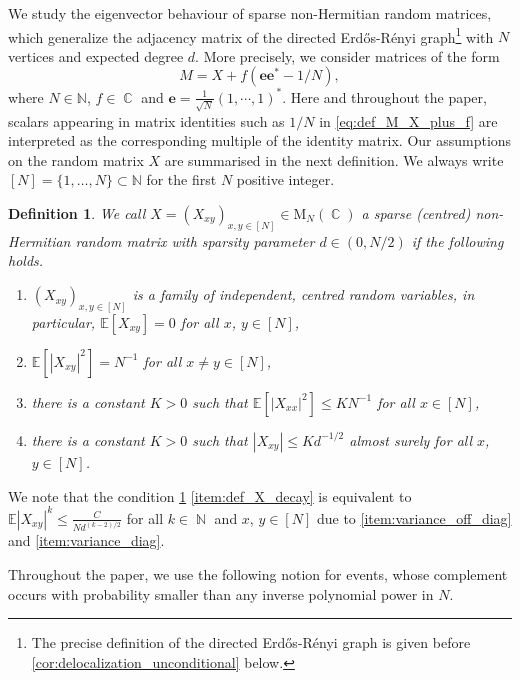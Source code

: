 \documentclass[11pt]{article}
\DeclareMathOperator{\CC}{\mathbb{C}}
\DeclareMathOperator{\NN}{\mathbb{N}}
\newcommand{\abs}[1]{\left| #1 \right|}
\newcommand{\N}{\mathbb{N}}
\newcommand{\E}{\mathbb{E}}
\theoremstyle{plain}
\newtheorem{defi}{Definition}[section]
\theoremstyle{remark}
\numberwithin{equation}{section}
\begin{document}
	We study the eigenvector behaviour of sparse non-Hermitian random matrices, which generalize 
	the adjacency matrix of the directed Erd\H{o}s-R{\'e}nyi graph\footnote{The precise definition of the directed Erd\H{o}s-R{\'e}nyi graph is given before \cref{cor:delocalization_unconditional} below.} with $N$ vertices and expected degree $d$.  More precisely, we consider matrices of the form 
	\begin{equation}\label{eq:def_M_X_plus_f}
		M= X + f (\mathbf{e}\mathbf{e}^{\ast} - 1/N), 
	\end{equation}
	where $N \in \N$, $ f\in \CC $ and $\mathbf{e} = \frac{1}{\sqrt{N}}(1,\cdots, 1)^{\ast}$. 
	Here and throughout the paper, scalars appearing in matrix identities such as $1/N$ in \cref{eq:def_M_X_plus_f} are interpreted as the corresponding multiple of the identity matrix. 
	Our assumptions on the random matrix $X$ are summarised in the next definition. 
	We always write $[N] = \{ 1, \ldots, N\}\subset \N $ for the first $N$ positive integer. 
	\begin{defi}\label{defiX}
		We call $X = (X_{xy})_{x, y \in [N]} \in \mathrm{M}_N(\CC)$ a \emph{sparse (centred) non-Hermitian random matrix} 
		with sparsity parameter $d \in (0,N/2)$ if the following holds. 
		\begin{enumerate}[label=(\alph*)]
			\item $(X_{xy})_{x, y \in [N]}$ is a family of independent, centred random variables, in particular, $\mathbb{E}[X_{xy}]= 0$ for all $x$, $y \in [N]$,
			\item  \label{item:variance_off_diag} $\E[\abs{X_{xy}}^2] = N^{-1}$ for all $x \neq y \in [N]$,
			\item  \label{item:variance_diag} 
			 there is a constant $K>0$ such that  $\E[\abs{X_{xx}}^2] \leq K N^{-1}$ for all $x \in [N]$, 
			\item \label{item:def_X_decay} 
			there is a constant $K>0$ such that $\abs{X_{xy}} \leq Kd^{-1/2}$ almost surely for all $x$, $y \in [N]$.
		\end{enumerate}
	\end{defi}
	
	 We note that the condition \cref{defiX} \cref{item:def_X_decay} is equivalent to $\E \abs{X_{xy}}^k \leq \frac{C}{Nd^{(k-2)/2}}$ for all $k\in \NN$ and $x$, $y \in [N]$ due to \cref{item:variance_off_diag} and \cref{item:variance_diag}.
	

	
	
	Throughout the paper, we use the following notion for events, whose complement occurs with probability smaller than any inverse polynomial power in $N$. 
	
\end{document}
